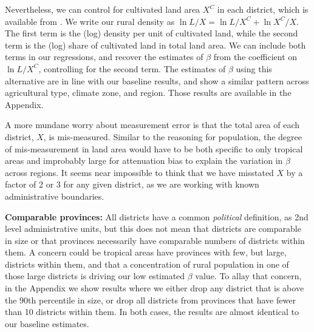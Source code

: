 \documentclass[11pt]{article}
\begin{document}
Nevertheless, we can control for cultivated land area $X^C$ in each district, which is available from \cite{gaez}. We write our rural density as $\ln L/X = \ln L/X^C + \ln X^C/X$. The first term is the (log) density per unit of cultivated land, while the second term is the (log) share of cultivated land in total land area. We can include both terms in our regressions, and recover the estimates of $\beta$ from the coefficient on $\ln L/X^C$, controlling for the second term. The estimates of $\beta$ using this alternative are in line with our baseline results, and show a similar pattern across agricultural type, climate zone, and region. Those results are available in the Appendix.

A more mundane worry about measurement error is that the total area of each district, $X$, is mis-measured. Similar to the reasoning for population, the degree of mis-measurement in land area would have to be both specific to only tropical areas and improbably large for attenuation bias to explain the variation in $\beta$ across regions. It seems near impossible to think that we have misstated $X$ by a factor of 2 or 3 for any given district, as we are working with known administrative boundaries.

\vspace{.5cm}\noindent\textbf{Comparable provinces:} All districts have a common \textit{political} definition, as 2nd level administrative units, but this does not mean that districts are comparable in size or that provinces necessarily have comparable numbers of districts within them. A concern could be tropical areas have provinces with few, but large, districts within them, and that a concentration of rural population in one of those large districts is driving our low estimated $\beta$ value. To allay that concern, in the Appendix we show results where we either drop any district that is above the 90th percentile in size, or drop all districts from provinces that have fewer than 10 districts within them. In both cases, the results are almost identical to our baseline estimates. 
\end{document}
